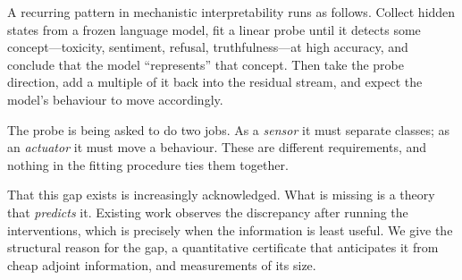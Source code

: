 \documentclass[11pt]{article}
\theoremstyle{definition}
\theoremstyle{remark}
\begin{document}
A recurring pattern in mechanistic interpretability runs as follows. Collect
hidden states from a frozen language model, fit a linear probe until it detects
some concept---toxicity, sentiment, refusal, truthfulness---at high accuracy,
and conclude that the model ``represents'' that concept. Then take the probe
direction, add a multiple of it back into the residual stream, and expect the
model's behaviour to move accordingly.

The probe is being asked to do two jobs. As a \emph{sensor} it must separate
classes; as an \emph{actuator} it must move a behaviour. These are different
requirements, and nothing in the fitting procedure ties them together.

That this gap exists is increasingly acknowledged. What is missing is a theory
that \emph{predicts} it. Existing work observes the discrepancy after running
the interventions, which is precisely when the information is least useful. We
give the structural reason for the gap, a quantitative certificate that
anticipates it from cheap adjoint information, and measurements of its size.
\end{document}
